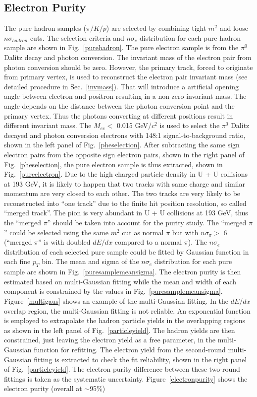 \subsection{Electron Purity}
\label{purity}
The pure hadron samples ($\pi/K/p$) are selected by combining tight $m^{2}$ and loose $n\sigma_{hadron}$ cuts. The selection criteria and $n\sigma_{e}$ distribution for each pure hadron sample are shown in Fig.~\ref{purehadron}. The pure electron sample is from the $\pi^{0}$ Dalitz decay and photon conversion. The invariant mass of the electron pair from photon conversion should be zero. However, the primary track, forced to originate from primary vertex, is used to reconstruct the electron pair invariant mass (see detailed procedure in Sec.~\ref{invmass}). That will introduce a artificial opening angle between electron and positron resulting in a non-zero invariant mass. The angle depends on the distance between the photon conversion point and the primary vertex. Thus the photons converting at different positions result in different invariant mass. The $M_{ee} <$ 0.015 GeV/$c^{2}$ is used to select the $\pi^{0}$ Dalitz decayed and photon conversion electrons with 148:1 signal-to-background ratio, shown in the left panel of Fig.~\ref{pheselection}. After subtracting the same sign electron pairs from the opposite sign electron pairs, shown in the right panel of Fig.~\ref{pheselection}, the pure electron sample is thus extracted, shown in Fig.~\ref{pureelectron}. Due to the high charged particle density in U + U collisions at 193 GeV, it is likely to happen that two tracks with same charge and similar momentum are very closed to each other. The two tracks are very likely to be reconstructed into ``one track'' due to the finite hit position resolution, so called ``merged track''. The pion is very abundant in U + U collisions at 193 GeV, thus the ``merged $\pi$'' should be taken into account for the purity study. The ``merged $\pi$'' could be selected using the same $m^{2}$ cut as normal $\pi$ but with $n\sigma_{\pi} >$ 6 (``merged $\pi$'' is with doubled $dE/dx$ compared to a normal $\pi$). The $n\sigma_{e}$ distribution of each selected pure sample could be fitted by Gaussian function in each fine $p_{T}$ bin. The mean and sigma of the $n\sigma_{e}$ distribution for each pure sample are shown in Fig.~\ref{puresamplemeansigma}. The electron purity is then estimated based on multi-Gaussian fitting while the mean and width of each component is constrained by the values in Fig.~\ref{puresamplemeansigma}. Figure~\ref{multigaus} shows an example of the multi-Gaussian fitting. In the $dE/dx$ overlap region, the multi-Gaussian fitting is not reliable. An exponential function is employed to extrapolate the hadron particle yields in the overlapping regions as shown in the left panel of  Fig.~\ref{particleyield}. The hadron yields are then constrained, just leaving the electron yield as a free parameter, in the multi-Gaussian function for refitting. The electron yield from the second-round multi-Gaussian fitting is extracted to check the fit reliability, shown in the right panel of Fig.~\ref{particleyield}. The electron purity difference between these two-round fittings is taken as the systematic uncertainty. Figure~\ref{electronpurity} shows the electron purity (overall at $\sim$95\%) 